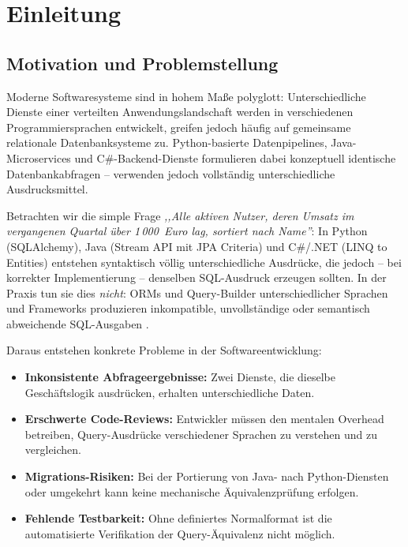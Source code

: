 ﻿%
\section{Einleitung}
\label{sec:einleitung}

\subsection{Motivation und Problemstellung}
\label{subsec:motivation}

Moderne Softwaresysteme sind in hohem Maße polyglott: Unterschiedliche Dienste
einer verteilten Anwendungslandschaft werden in verschiedenen Programmiersprachen
entwickelt, greifen jedoch häufig auf gemeinsame relationale Datenbanksysteme zu.
Python-basierte Datenpipelines, Java-Microservices und C\#-Backend-Dienste
formulieren dabei konzeptuell identische Datenbankabfragen -- verwenden jedoch
vollständig unterschiedliche Ausdrucksmittel.

Betrachten wir die simple Frage \emph{,,Alle aktiven Nutzer, deren Umsatz im
vergangenen Quartal über 1\,000~Euro lag, sortiert nach Name''}: In Python
(SQLAlchemy), Java (Stream API mit JPA Criteria) und C\#/.NET (LINQ to Entities)
entstehen syntaktisch völlig unterschiedliche Ausdrücke, die jedoch -- bei
korrekter Implementierung -- denselben SQL-Ausdruck erzeugen sollten. In der
Praxis tun sie dies \emph{nicht}: ORMs und Query-Builder unterschiedlicher
Sprachen und Frameworks produzieren inkompatible, unvollständige oder semantisch
abweichende SQL-Ausgaben \cite{ansi_sql_2016,hibernate_docs,ef_core_docs}.

Daraus entstehen konkrete Probleme in der Softwareentwicklung:

\begin{itemize}[leftmargin=1.5cm]
  \item \textbf{Inkonsistente Abfrageergebnisse:} Zwei Dienste, die dieselbe
    Geschäftslogik ausdrücken, erhalten unterschiedliche Daten.
  \item \textbf{Erschwerte Code-Reviews:} Entwickler müssen den mentalen Overhead
    betreiben, Query-Ausdrücke verschiedener Sprachen zu verstehen und zu vergleichen.
  \item \textbf{Migrations-Risiken:} Bei der Portierung von Java- nach Python-Diensten
    oder umgekehrt kann keine mechanische Äquivalenzprüfung erfolgen.
  \item \textbf{Fehlende Testbarkeit:} Ohne definiertes Normalformat ist die
    automatisierte Verifikation der Query-Äquivalenz nicht möglich.
\end{itemize}

